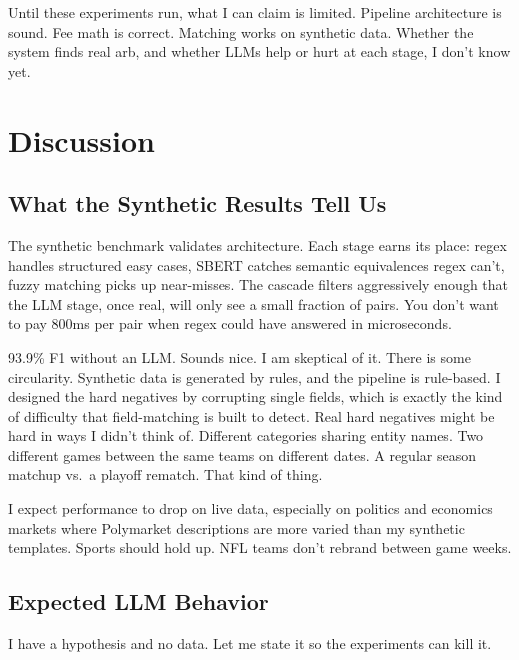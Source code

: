 \documentclass[11pt]{article}
\theoremstyle{definition}
\theoremstyle{remark}
\begin{document}
Until these experiments run, what I can claim is limited. Pipeline architecture is sound. Fee math is correct. Matching works on synthetic data. Whether the system finds real arb, and whether LLMs help or hurt at each stage, I don't know yet.

\section{Discussion}
\label{sec:discussion}

\subsection{What the Synthetic Results Tell Us}
\label{sec:synth-discuss}

The synthetic benchmark validates architecture. Each stage earns its place: regex handles structured easy cases, SBERT catches semantic equivalences regex can't, fuzzy matching picks up near-misses. The cascade filters aggressively enough that the LLM stage, once real, will only see a small fraction of pairs. You don't want to pay 800ms per pair when regex could have answered in microseconds.

93.9\% F1 without an LLM. Sounds nice. I am skeptical of it. There is some circularity. Synthetic data is generated by rules, and the pipeline is rule-based. I designed the hard negatives by corrupting single fields, which is exactly the kind of difficulty that field-matching is built to detect. Real hard negatives might be hard in ways I didn't think of. Different categories sharing entity names. Two different games between the same teams on different dates. A regular season matchup vs.\ a playoff rematch. That kind of thing.

I expect performance to drop on live data, especially on politics and economics markets where Polymarket descriptions are more varied than my synthetic templates. Sports should hold up. NFL teams don't rebrand between game weeks.

\subsection{Expected LLM Behavior}
\label{sec:expected}

I have a hypothesis and no data. Let me state it so the experiments can kill it.
\end{document}

